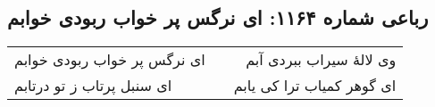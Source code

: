 \begin{center}
\section*{رباعی شماره ۱۱۶۴: ای نرگس پر خواب ربودی خوابم}
\label{sec:1164}
\begin{longtable}{l p{0.5cm} r}
ای نرگس پر خواب ربودی خوابم
&&
وی لالهٔ سیراب ببردی آبم
\\
ای سنبل پرتاب ز تو درتابم
&&
ای گوهر کمیاب ترا کی یابم
\\
\end{longtable}
\end{center}
